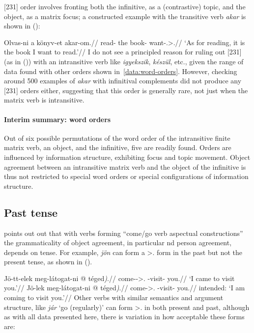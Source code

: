 [231] order involves fronting both the infinitive, as a (contrastive) topic,
and the object, as a matrix focus; a constructed example with the transitive
verb \emph{akar} is shown in (\nextx):

\ex
    \begingl
        \gla 	Olvas-ni a könyv-et akar-om.//
        \glb 	read-\Inf{} the book-\Acc{} want-\Fsg.\Sbj>\Third.\Obj{}//
        \glft 	\enquote*{As for reading, it is the book I want to read.}//
    \endgl
\xe
I do not see a principled reason for ruling out [231] (as in (\lastx)) with an
intransitive verb like \emph{igyekszik}, \emph{készül}, etc., given the range
of data found with other orders shown in~\eqref{data:word-orders}. However,
checking around 500 examples of \emph{akar} with infinitival complements did
not produce any [231] orders either, suggesting that this order is generally
rare, not just when the matrix verb is intransitive.

\paragraph{Interim summary: word orders}

Out of six possible permutations of the word order of the intransitive finite
matrix verb, an object, and the infinitive, five are readily found. Orders are
influenced by information structure, exhibiting focus and topic movement.
Object agreement between an intransitive matrix verb and the object of the
infinitive is thus not restricted to special word orders or special
configurations of information structure.

\subsection{Past tense}\label{sub:past-tense}

\Textcite{denDikken2004} points out out that with verbs forming
\enquote{come/go verb aspectual constructions} the grammaticality of object
agreement, in particular \Second{}nd person agreement, depends on tense. For
example, \emph{jön} can form a \Fsg>\Second.\Obj{} form in the past but not the
present tense, as shown in (\nextx).

\pex
    \a
    \begingl
        \gla 	Jö-tt-elek meg-látogat-ni \nogloss{(} @ téged\emph{)}.//
        \glb 	come-\Pst-\Fsg>\Second.\Obj{} \Vm-visit-\Inf{} you.\Acc{}//
        \glft 	\enquote*{I came to visit you.}//
    \endgl
    \a
    \begingl
        \gla 	\ljudge*Jö-lek meg-látogat-ni \nogloss{(} @ téged\emph{)}.//
        \glb 	come-\Fsg>\Second.\Obj{} \Vm-visit-\Inf{} you.\Acc{}//
        \glft 	intended: \enquote*{I am coming to visit you.}//
    \endgl
\xe
Other verbs with similar semantics and argument structure, like \emph{jár}
\enquote*{go (regularly)} can form \Fsg>\Second.\Obj{} in both present and
past, although as with all data presented here, there is variation in how
acceptable these forms are:

